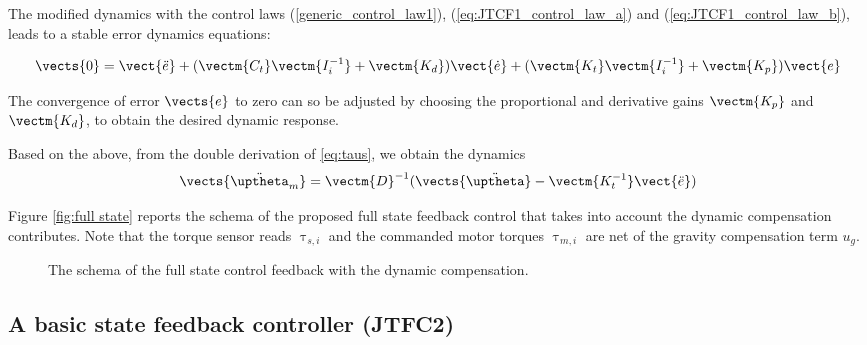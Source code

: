 	
	The modified dynamics with the control laws  (\ref{generic_control_law1}), (\ref{eq:JTCF1_control_law_a}) and (\ref{eq:JTCF1_control_law_b}), leads to a stable error dynamics equations:
	
	\begin{equation}
	\vects{0}  = \vect{\ddot{e}} + ( \vectm{C_t} \vectm{I_i^{-1}} + \vectm{K_d} )\vect{\dot{e}}+ ( \vectm{K_t} \vectm{I_i^{-1}}  + \vectm{K_p}   )\vect{e}
	\end{equation}
	
	The convergence of error $\vects{e}$ to zero can so be adjusted by choosing the proportional and derivative gains $\vectm{K_p}$ and $\vectm{K_d}$, to obtain the desired dynamic response.
	
	
	Based on the above, from the double derivation of \eqref{eq:taus}, we obtain the dynamics
	\begin{equation} 
	\vects{\ddot{\uptheta}_m} = \vectm{D}^{-1} (\vects{\ddot{\uptheta}} -\vectm{K_t^{-1}} \vect{\ddot{e}}) \label{eq:taus_deriv} 
	\end{equation}	
	
	
	\par Figure \ref{fig:full state} reports the schema of the proposed full state feedback control that takes into account the dynamic compensation contributes. Note that the torque sensor reads $\uptau_{s,i}$ and the commanded motor torques  $\uptau_{m,i}$ are net of the gravity compensation term $u_g$.
	
	\begin{figure}[]
		\centering
		\def\svgwidth{1\columnwidth}
		\begin{footnotesize}
			
		\end{footnotesize}
		\caption{The schema of the full state control feedback with the dynamic compensation.}
		\label{fig:fullstate}
	\end{figure}



\subsection{A basic state feedback controller (JTFC2)} \label{subsec:JTFC2}

